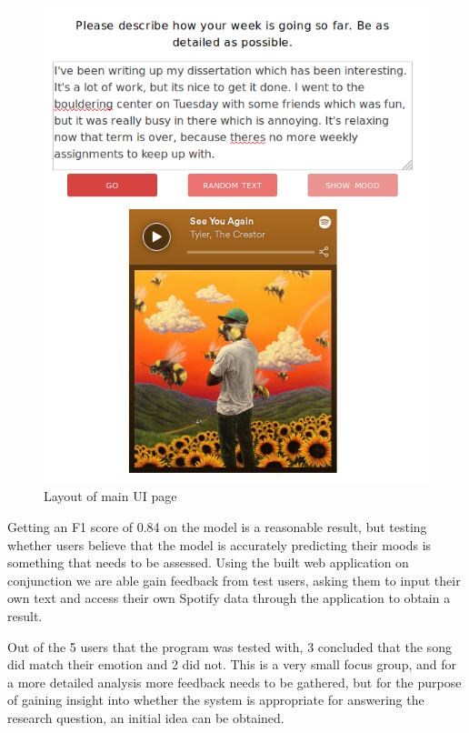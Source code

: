 \begin{figure}[ht]
\centering
\includegraphics[scale=0.4]{implementation/tamara.png}
\caption{Layout of main UI page}
\label{UIlayout}
\end{figure}

Getting an F1 score of 0.84 on the model is a reasonable result, but testing whether users believe that the model is accurately predicting their moods is something that needs to be assessed. Using the built web application on conjunction we are able gain feedback from test users, asking them to input their own text and access their own Spotify data through the application to obtain a result. 

Out of the 5 users that the program was tested with, 3 concluded that the song did match their emotion and 2 did not. This is a very small focus group, and for a more detailed analysis more feedback needs to be gathered, but for the purpose of gaining insight into whether the system is appropriate for answering the research question, an initial idea can be obtained.

